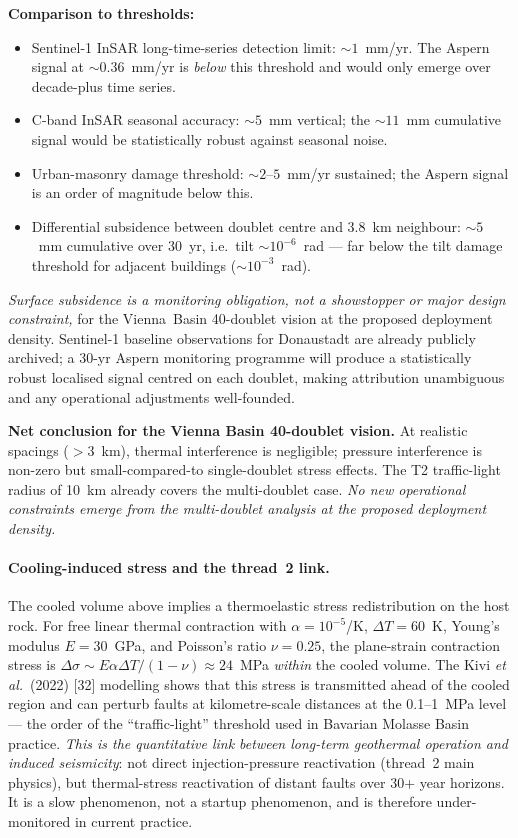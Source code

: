 \documentclass{article}
\begin{document}
\textbf{Comparison to thresholds:}
\begin{itemize}
\item Sentinel-1 InSAR long-time-series detection limit: $\sim 1$~mm/yr.
The Aspern signal at $\sim 0.36$~mm/yr is \emph{below} this threshold
and would only emerge over decade-plus time series.
\item C-band InSAR seasonal accuracy: $\sim 5$~mm vertical; the
$\sim 11$~mm cumulative signal would be statistically robust against
seasonal noise.
\item Urban-masonry damage threshold: $\sim 2$--$5$~mm/yr sustained;
the Aspern signal is an order of magnitude below this.
\item Differential subsidence between doublet centre and 3.8~km
neighbour: $\sim 5$~mm cumulative over 30~yr, i.e.\ tilt
$\sim 10^{-6}$~rad --- far below the tilt damage threshold for
adjacent buildings ($\sim 10^{-3}$~rad).
\end{itemize}

\emph{Surface subsidence is a monitoring obligation, not a
showstopper or major design constraint,} for the Vienna~Basin
40-doublet vision at the proposed deployment density. Sentinel-1
baseline observations for Donaustadt are already publicly archived;
a 30-yr Aspern monitoring programme will produce a statistically
robust localised signal centred on each doublet, making attribution
unambiguous and any operational adjustments well-founded.

\textbf{Net conclusion for the Vienna Basin 40-doublet vision.}
At realistic spacings ($> 3$~km), thermal interference is
negligible; pressure interference is non-zero but
small-compared-to single-doublet stress effects. The T2
traffic-light radius of 10~km already covers the multi-doublet
case. \emph{No new operational constraints emerge from the
multi-doublet analysis at the proposed deployment density.}

\paragraph{Cooling-induced stress and the thread~2 link.} The
cooled volume above implies a thermoelastic stress redistribution
on the host rock. For free linear thermal contraction with
$\alpha = 10^{-5}$/K, $\Delta T = 60$~K, Young's modulus
$E = 30$~GPa, and Poisson's ratio $\nu = 0.25$, the
plane-strain contraction stress is
$\Delta\sigma \sim E\alpha\Delta T/(1-\nu)\approx 24$~MPa
\emph{within} the cooled volume. The Kivi \emph{et al.}\ (2022) [32]
modelling shows that this stress is transmitted ahead of the
cooled region and can perturb faults at kilometre-scale
distances at the 0.1--1~MPa level --- the order of the
``traffic-light'' threshold used in Bavarian Molasse Basin
practice. \emph{This is the quantitative link between long-term
geothermal operation and induced seismicity}: not direct
injection-pressure reactivation (thread~2 main physics), but
thermal-stress reactivation of distant faults over 30+ year
horizons. It is a slow phenomenon, not a startup phenomenon,
and is therefore under-monitored in current practice.
\end{document}
